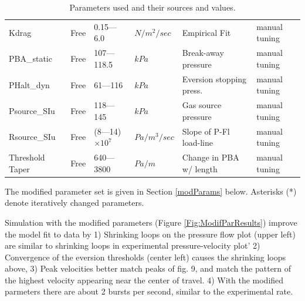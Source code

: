 \documentclass[letterpaper]{article}
\begin{document}
\begin{table}
\begin{tabular}{l|l|l|l|l|l}
Kdrag         &  Free      & 0.15---6.0   &  $N/m^2/sec$ & Empirical Fit & manual tuning \\
PBA\_static    &  Free      & 107---118.5  &  $kPa$      & Break-away pressure  & manual tuning \\
PHalt\_dyn     &  Free      & 61---116     &  $kPa$      & Eversion stopping press.  & manual tuning \\
Psource\_SIu   &  Free      & 118---145    &  $kPa$      & Gas source pressure & manual tuning\\
Rsource\_SIu   &  Free      & (8---14)$\times10^7$ &  $Pa/m^3/sec$    & Slope of P-Fl load-line & manual tuning\\
Threshold Taper & Free     &  640---3800  &  $Pa/m$      & Change in PBA w/ length   & manual tuning\\
\end{tabular}
\caption{Parameters used and their sources and values. }\label{Tab:paramClass}
\end{table}
\vspace{0.175in}

The modified parameter set is given in Section \ref{modParams} below.  Asterisks (*) denote iteratively changed parameters.

Simulation with the modified parameters (Figure \ref{Fig:ModifParResults}) improve the model fit to data by
    1) Shrinking loops on the pressure flow plot (upper left) are similar
  to shrinking loops in experimental pressure-velocity plot'
    2) Convergence of the eversion thresholds (center left) causes the shrinking loops above,
    3) Peak velocities better match peaks of fig. 9, and match the pattern of the highest velocity
  appearing near the center of travel.
    4) With the modified parmeters there are about 2 bursts per second, similar to the experimental rate.
\end{document}
